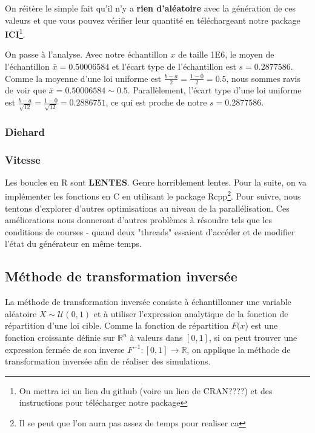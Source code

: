 \documentclass[10pt]{article} %
\begin{document}
On réitère le simple fait qu'il n'y a \textbf{rien d'aléatoire} avec la génération de ces valeurs et que vous pouvez vérifier leur quantité en
téléchargeant notre package \textbf{ICI}\footnote{On mettra ici un lien du github (voire un lien de CRAN????) et des instructions pour télécharger notre package}.

On passe à l'analyse. Avec notre échantillon $x$ de taille 1E6, le moyen de l'échantillon $\bar x = 0.50006584$ et l'écart type de l'échantillon est $s = 0.2877586$.
Comme la moyenne d'une loi uniforme est $\frac{b - a}{2} = \frac{1 - 0}{2} = 0.5$, nous sommes ravis de voir que $\bar x = 0.50006584 \sim 0.5$. Parallèlement, l'écart type
d'une loi uniforme est $\frac{b - a}{\sqrt{12}} = \frac{1 - 0}{\sqrt{12}} = 0.2886751$, ce qui est proche de notre $s = 0.2877586$.

\subsubsection{Diehard}


\subsubsection{Vitesse}

Les boucles en R sont \textbf{LENTES}. Genre horriblement lentes. Pour la suite, on va implémenter les fonctions en C en utilisant le package Rcpp\footnote{Il se peut que l'on aura pas assez de temps pour realiser ca}. Pour suivre, nous tentons d'explorer d'autres optimisations au niveau de la parallélisation. Ces améliorations nous donneront d'autres problèmes à résoudre tels que les conditions de courses - quand deux "threads" essaient d'accéder et
de modifier l'état du générateur en même temps.

\subsection{Méthode de transformation inversée}

La méthode de transformation inversée consiste à échantillonner une variable aléatoire $X \sim \mathcal{U}(0, 1)$ et à utiliser l'expression analytique
de la fonction de répartition d'une loi cible. Comme la fonction de répartition $F(x$) est une fonction croissante définie sur $\mathbb{R}^n$ à valeurs dans
$[0, 1]$, si on peut trouver une expression fermée de son inverse $F^{-1} : [0, 1] \longrightarrow \mathbb{R}$, on applique la méthode de transformation inversée
afin de réaliser des simulations.
\end{document}
